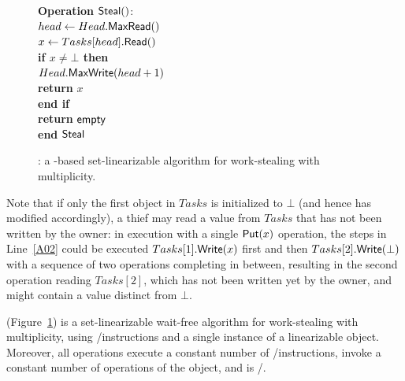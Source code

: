 \begin{figure}[H]
{\begin{minipage}[t]{150mm}
\begin{tabbing}
        {\bf Operation} \({\sf Steal}()\): \\
         \> \> \(head \leftarrow Head.{\sf MaxRead}()\)\\
         \> \> \(x \leftarrow Tasks[head].{\sf Read}()\) \\
         \> \> {\bf if \(x \neq \bot\) then}\\
         \> \> \> \(Head.{\sf MaxWrite}(head+1)\)\\

         \> \> \> {\bf return} \(x\)\\
         \> \> {\bf end if}\\
         \> \> {\bf return} ${\sf empty}$\\
        {\bf end} ${\sf Steal}$

      \end{tabbing}
    \end{minipage}
  }
  \caption{\label{figure-max-reg-mult}\WFWSM: a \MaxReg-based
    set-linearizable algorithm for work-stealing with multiplicity.}
\end{figure}

Note that if only the first object in \(Tasks\) is initialized to \(\bot\) (and hence \Put has modified accordingly), a thief may read a value from \(Tasks\) that has not been written by the owner: in execution with a single \({\sf Put}(x)\) operation, the steps in Line~\ref{A02} could be executed \(Tasks[1].{\sf Write}(x)\) first and then \(Tasks[2].{\sf Write}(\bot)\) with a sequence of two \Steal operations completing in between, resulting in the second operation reading $Tasks[2]$, which has not been written yet by the owner, and might contain a value distinct from \(\bot\).


\begin{theorem}\label{theo-wf}
\WFWSM (Figure~\ref{figure-max-reg-mult}) is a set-linearizable wait-free algorithm for work-stealing with multiplicity, using \R/\W instructions and a single instance of a linearizable \MaxReg object. Moreover, all operations execute a constant number of \R/\W instructions, invoke a constant number of operations of the \MaxReg object, and \Put is \R/\W.
\end{theorem}

